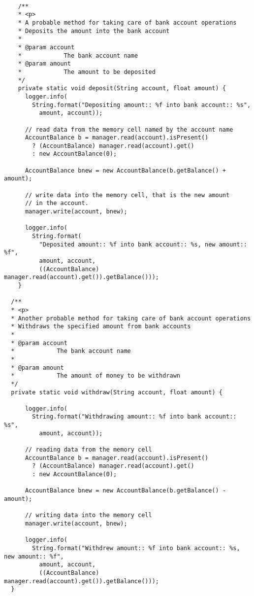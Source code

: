 \documentclass[../main]{subfiles}
\begin{document}
  \begin{lstlisting}

    /**
    * <p>
    * A probable method for taking care of bank account operations
    * Deposits the amount into the bank account
    * 
    * @param account
    *            The bank account name
    * @param amount
    *            The amount to be deposited
    */
    private static void deposit(String account, float amount) {
      logger.info(
        String.format("Depositing amount:: %f into bank account:: %s", 
          amount, account));
    
      // read data from the memory cell named by the account name
      AccountBalance b = manager.read(account).isPresent() 
        ? (AccountBalance) manager.read(account).get()
        : new AccountBalance(0);
    
      AccountBalance bnew = new AccountBalance(b.getBalance() + amount);
    
      // write data into the memory cell, that is the new amount
      // in the account.
      manager.write(account, bnew);
    
      logger.info(
        String.format(
          "Deposited amount:: %f into bank account:: %s, new amount:: %f", 
          amount, account,
          ((AccountBalance) manager.read(account).get()).getBalance()));
    }

  /**
  * <p>
  * Another probable method for taking care of bank account operations
  * Withdraws the specified amount from bank accounts
  * 
  * @param account
  *            The bank account name
  * 
  * @param amount
  *            The amount of money to be withdrawn
  */
  private static void withdraw(String account, float amount) {
       
      logger.info(
        String.format("Withdrawing amount:: %f into bank account:: %s", 
          amount, account));
      
      // reading data from the memory cell
      AccountBalance b = manager.read(account).isPresent() 
        ? (AccountBalance) manager.read(account).get()
        : new AccountBalance(0);
       
      AccountBalance bnew = new AccountBalance(b.getBalance() - amount);
      
      // writing data into the memory cell
      manager.write(account, bnew);
       
      logger.info(
        String.format("Withdrew amount:: %f into bank account:: %s, new amount:: %f", 
          amount, account,
          ((AccountBalance) manager.read(account).get()).getBalance()));
  }
  \end{lstlisting}
\end{document}
